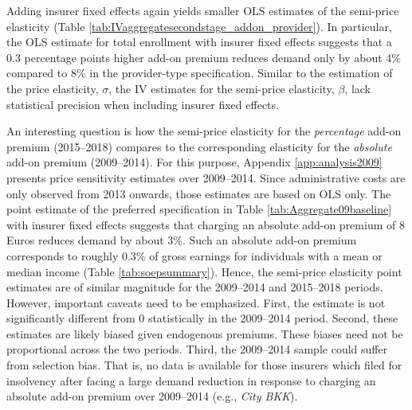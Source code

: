 \documentclass[a4paper, 11pt, english]{article}
\begin{document}
Adding insurer fixed effects again yields smaller OLS estimates of the semi-price elasticity (Table \ref{tab:IVaggregatesecondstage_addon_provider}). In particular, the OLS estimate for total enrollment with insurer fixed effects suggests that a 0.3 percentage points higher add-on premium reduces demand only by about 4\% compared to 8\% in the provider-type specification. Similar to the estimation of the price elasticity, $\sigma$, the IV estimates  for the semi-price elasticity, $\beta$, lack statistical precision when including insurer fixed effects.

An interesting question is how the semi-price elasticity for the \textit{percentage} add-on premium (2015--2018) compares to the corresponding elasticity for the \textit{absolute} add-on premium (2009--2014). For this purpose, Appendix \ref{app:analysis2009} presents price sensitivity estimates over 2009--2014. Since administrative costs are only observed from 2013 onwards, those estimates are based on OLS only. The point estimate of the preferred specification in Table \ref{tab:Aggregate09baseline} with insurer fixed effects suggests that charging an absolute add-on premium of 8 Euros reduces demand by about 3\%. Such an absolute add-on premium corresponds to roughly 0.3\% of gross earnings for individuals with a mean or median income (Table \ref{tab:soepsummary}). Hence, the semi-price elasticity point estimates are of similar magnitude for the 2009--2014 and 2015--2018 periods. However, important caveats need to be emphasized. First, the estimate is not significantly different from 0 statistically in the 2009--2014 period. Second, these estimates are likely biased given endogenous premiums. These biases need not be proportional across the two periods. Third, the 2009--2014 sample could suffer from selection bias. That is, no data is available for those insurers which filed for insolvency after facing a large demand reduction in response to charging an absolute add-on premium over 2009--2014 (e.g., \textit{City BKK}).

\end{document}
